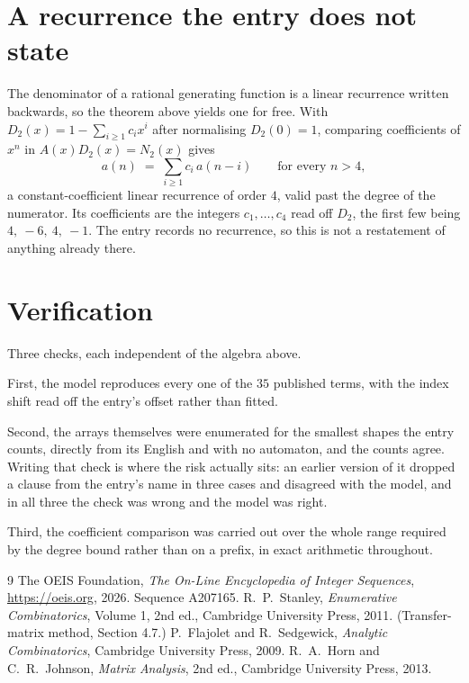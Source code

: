 \documentclass[11pt,a4paper]{article}
\theoremstyle{plain}
\theoremstyle{definition}
\begin{document}
\section{A recurrence the entry does not state}

The denominator of a rational generating function is a linear recurrence written backwards, so
the theorem above yields one for free. With $D_2(x)=1-\sum_{i\ge1}c_ix^i$ after normalising
$D_2(0)=1$, comparing coefficients of $x^n$ in $A(x)D_2(x)=N_2(x)$ gives
\[
a(n)\;=\;\sum_{i\ge1}c_i\,a(n-i)\qquad\text{for every }n>4,
\]
a constant-coefficient linear recurrence of order $4$, valid past the degree of the
numerator. Its coefficients are the integers $c_1,\dots,c_{4}$ read off $D_2$, the first few being $4,\ -6,\ 4,\ -1$. The entry records no recurrence, so this is not a restatement of anything
already there.

\section{Verification}

Three checks, each independent of the algebra above.

First, the model reproduces every one of the $35$ published terms, with the index shift
read off the entry's offset rather than fitted.

Second, the arrays themselves were enumerated for the smallest shapes the entry counts,
directly from its English and with no automaton, and the counts agree. Writing that check is
where the risk actually sits: an earlier version of it dropped a clause from the entry's name
in three cases and disagreed with the model, and in all three the check was wrong and the model
was right.

Third, the coefficient comparison was carried out over the whole range required by the degree
bound rather than on a prefix, in exact arithmetic throughout.

\begin{thebibliography}{9}
 The OEIS Foundation, \emph{The On-Line Encyclopedia of Integer
Sequences}, \url{https://oeis.org}, 2026. Sequence A207165.
 R.~P.~Stanley, \emph{Enumerative Combinatorics}, Volume 1, 2nd ed.,
Cambridge University Press, 2011. (Transfer-matrix method, Section 4.7.)
 P.~Flajolet and R.~Sedgewick, \emph{Analytic Combinatorics}, Cambridge
University Press, 2009.
 R.~A.~Horn and C.~R.~Johnson, \emph{Matrix Analysis}, 2nd ed., Cambridge
University Press, 2013.
\end{thebibliography}
\end{document}
